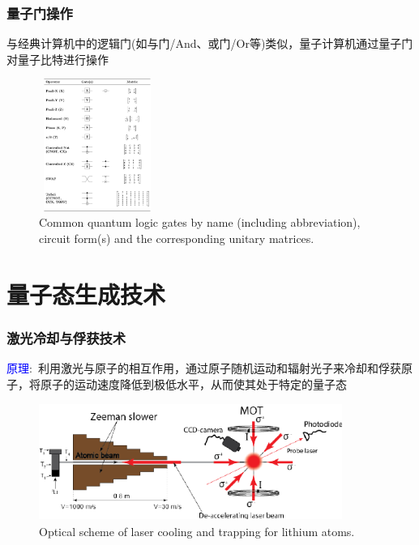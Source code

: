 \begin{frame}
    \frametitle{量子门操作}
    与经典计算机中的逻辑门\textrm{(如与门/And、或门/Or等)}类似，量子计算机通过量子门对量子比特进行操作\\
{\fontsize{7.5pt}{5.2pt}}
    \begin{figure}
        \centering
                \includegraphics[height=1.7in, width=1.5in, viewport=0 0 390 430,clip]{Figures/Quantum_Logic_Gates.png}
		\caption{\tiny{\textrm{Common quantum logic gates by name (including abbreviation), circuit form(s) and the corresponding unitary matrices.}}}
		\label{Fig:Quantum_Logic_Gates}
    \end{figure}
\end{frame}

\section{量子态生成技术}
\begin{frame}
    \frametitle{激光冷却与俘获技术}
    \textcolor{blue}{原理}:~利用激光与原子的相互作用，通过原子随机运动和辐射光子来冷却和俘获原子，将原子的运动速度降低到极低水平，从而使其处于特定的量子态
    \begin{figure}
        \centering
                \includegraphics[height=1.5in, width=3.9in, viewport=0 0 472 179,clip]{Figures/Optical-scheme-of-laser-cooling-and-trapping-for-lithium-atoms.png}
		\caption{\tiny{\textrm{Optical scheme of laser cooling and trapping for lithium atoms.}}}
		\label{Fig:Optical-scheme-of-laser-cooling-and-trapping-for-lithium-atoms}
    \end{figure}
	    \vskip -10pt
    {\fontsize{7.5pt}{5.2pt}}
\end{frame}


